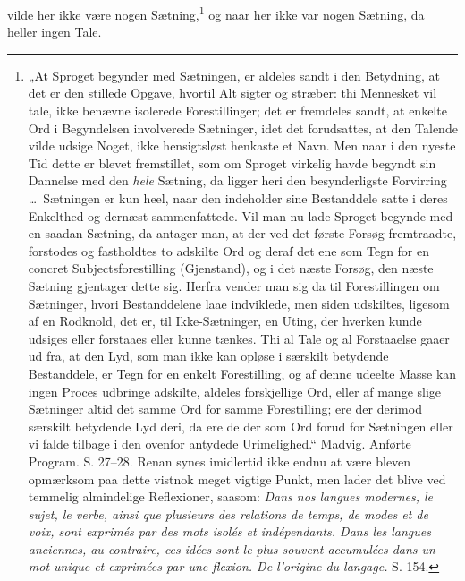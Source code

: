 \documentclass[12pt]{book}
\begin{document}
vilde her ikke være nogen Sætning,\footnote{„At Sproget begynder med Sætningen, er aldeles sandt i den Betydning,
at det er den stillede Opgave, hvortil Alt sigter og stræber:
thi Mennesket vil tale, ikke benævne isolerede Forestillinger; det er
fremdeles sandt, at enkelte Ord i Begyndelsen involverede Sætninger,
idet det forudsattes, at den Talende vilde udsige Noget,
ikke hensigtsløst henkaste et Navn. Men naar i den nyeste Tid
dette er blevet fremstillet, som om Sproget virkelig havde begyndt
sin Dannelse med den \emph{hele} Sætning, da ligger heri den besynderligste
Forvirring \dots\ Sætningen er kun heel, naar den indeholder
sine Bestanddele satte i deres Enkelthed og dernæst sammenfattede.
Vil man nu lade Sproget begynde med en saadan Sætning, da
antager man, at der ved det første Forsøg fremtraadte, forstodes
og fastholdtes to adskilte Ord og deraf det ene som Tegn for en
concret Subjectsforestilling (Gjenstand), og i det næste Forsøg, den
næste Sætning gjentager dette sig. Herfra vender man sig da til
Forestillingen om Sætninger, hvori Bestanddelene laae indviklede,
men siden udskiltes, ligesom af en Rodknold, det er, til Ikke-Sætninger,
en Uting, der hverken kunde udsiges eller forstaaes eller
kunne tænkes. Thi al Tale og al Forstaaelse gaaer ud fra, at den
Lyd, som man ikke kan opløse i særskilt betydende Bestanddele, er Tegn
for en enkelt Forestilling, og af denne udeelte Masse kan ingen Proces
udbringe adskilte, aldeles forskjellige Ord, eller af mange slige Sætninger
altid det samme Ord for samme Forestilling; ere der derimod
særskilt betydende Lyd deri, da ere de der som Ord forud for Sætningen
eller vi falde tilbage i den ovenfor antydede Urimelighed.“ Madvig.
Anførte Program. S. 27--28. Renan synes imidlertid ikke endnu
at være bleven opmærksom paa dette vistnok meget vigtige Punkt,
men lader det blive ved temmelig almindelige Reflexioner, saasom:
\textit{Dans nos langues modernes, le sujet, le verbe, ainsi que plusieurs
des relations de temps, de modes et de voix, sont exprimés par
des mots isolés et indépendants. Dans les langues anciennes,
au contraire, ces idées sont le plus souvent accumulées dans un
mot unique et exprimées par une flexion. De l'origine du langage.}
S. 154.}%
og naar her ikke var
nogen Sætning, da heller ingen Tale.
\end{document}
